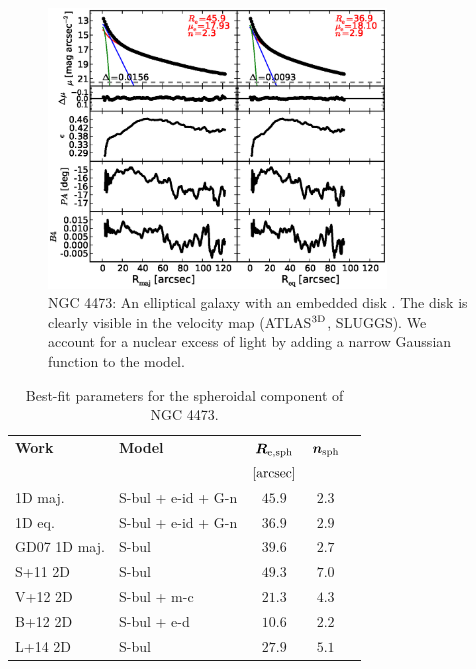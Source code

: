 \documentclass[preprint2]{emulateapj}
\newcommand{\fitfigurewidth}{0.8\textwidth}
\begin{document}
  \begin{figure}[h]
  \begin{center}
  \includegraphics[width=\fitfigurewidth]{n4473_1Dfit.eps}
  \caption{NGC 4473: 
  An elliptical galaxy with an embedded disk \citep{ledo2010}.
  The disk is clearly visible in the velocity map (ATLAS$^{\rm 3D}$, SLUGGS). 
  We account for a nuclear excess of light by adding a narrow Gaussian function to the model.
  }
  \end{center}
  \end{figure}
  
  \begin{table}[h]
  \small
  \caption{Best-fit parameters for the spheroidal component of NGC 4473.}
  \begin{center}
  \begin{tabular}{llccc}
  \hline
  {\bf Work} & {\bf Model}   & $\bm R_{\rm e,sph}$    & $\bm n_{\rm sph}$ \\
    &  &  $[\rm arcsec]$ & \\
  \hline
  1D maj. & S-bul + e-id + G-n & $45.9$  &  $2.3$ \\
  1D eq.  & S-bul + e-id + G-n & $36.9$  &  $2.9$ \\
  \hline
  GD07 1D maj.      & S-bul                 & $39.6$   &  $2.7$ \\
  S+11 2D      & S-bul                 & $49.3$   &  $7.0$ \\
  V+12 2D      & S-bul + m-c           & $21.3$   &  $4.3$ \\
  B+12 2D      & S-bul + e-d           & $10.6$   &  $2.2$ \\
  L+14 2D      & S-bul                 & $27.9$   &  $5.1$ \\
  \hline
  \end{tabular}
  \end{center}
  \label{tab:n4459}
  \end{table}
\end{document}
